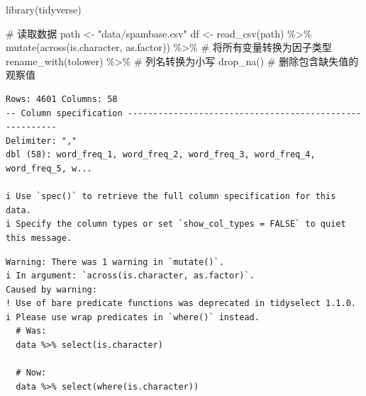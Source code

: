 \documentclass[
  letterpaper,
  DIV=11,
  numbers=noendperiod]{scrartcl}
\newenvironment{Shaded}{\begin{snugshade}}{\end{snugshade}}
\newcommand{\CommentTok}[1]{\textcolor[rgb]{0.37,0.37,0.37}{#1}}
\newcommand{\FunctionTok}[1]{\textcolor[rgb]{0.28,0.35,0.67}{#1}}
\newcommand{\NormalTok}[1]{\textcolor[rgb]{0.00,0.23,0.31}{#1}}
\newcommand{\OtherTok}[1]{\textcolor[rgb]{0.00,0.23,0.31}{#1}}
\newcommand{\SpecialCharTok}[1]{\textcolor[rgb]{0.37,0.37,0.37}{#1}}
\newcommand{\StringTok}[1]{\textcolor[rgb]{0.13,0.47,0.30}{#1}}
\begin{document}
\begin{Shaded}
\begin{Highlighting}[]
\FunctionTok{library}\NormalTok{(tidyverse)}

\CommentTok{\# 读取数据}
\NormalTok{path }\OtherTok{\textless{}{-}} \StringTok{"data/spambase.csv"}
\NormalTok{df }\OtherTok{\textless{}{-}} \FunctionTok{read\_csv}\NormalTok{(path) }\SpecialCharTok{\%\textgreater{}\%}
  \FunctionTok{mutate}\NormalTok{(}\FunctionTok{across}\NormalTok{(is.character, as.factor)) }\SpecialCharTok{\%\textgreater{}\%} \CommentTok{\# 将所有变量转换为因子类型}
  \FunctionTok{rename\_with}\NormalTok{(tolower) }\SpecialCharTok{\%\textgreater{}\%} \CommentTok{\# 列名转换为小写}
  \FunctionTok{drop\_na}\NormalTok{() }\CommentTok{\# 删除包含缺失值的观察值}
\end{Highlighting}
\end{Shaded}

\begin{verbatim}
Rows: 4601 Columns: 58
-- Column specification --------------------------------------------------------
Delimiter: ","
dbl (58): word_freq_1, word_freq_2, word_freq_3, word_freq_4, word_freq_5, w...

i Use `spec()` to retrieve the full column specification for this data.
i Specify the column types or set `show_col_types = FALSE` to quiet this message.
\end{verbatim}

\begin{verbatim}
Warning: There was 1 warning in `mutate()`.
i In argument: `across(is.character, as.factor)`.
Caused by warning:
! Use of bare predicate functions was deprecated in tidyselect 1.1.0.
i Please use wrap predicates in `where()` instead.
  # Was:
  data %>% select(is.character)

  # Now:
  data %>% select(where(is.character))
\end{verbatim}

\begin{Shaded}
\end{Shaded}
\end{document}
